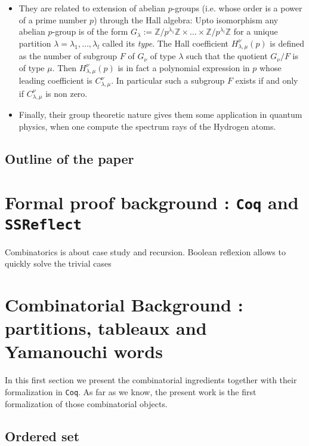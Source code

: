 \documentclass[12pt,a4paper]{article}
\newcommand{\Coq}{\texttt{Coq}\xspace}
\newcommand{\SSR}{\texttt{SSReflect}\xspace}
\newcommand{\Z}{{\mathbb Z}}
\begin{document}
\begin{itemize}
  \item They are related to extension of abelian $p$-groups (i.e. whose order
    is a power of a prime number $p$) through the Hall algebra: Upto
    isomorphism any abelian $p$-group is of the form
    $G_\lambda:=\Z/p^{\lambda_1}\Z\times\dots\times\Z/p^{\lambda_{l}}\Z$ for a
    unique partition $\lambda=\lambda_1,\dots,\lambda_{l}$ called its
    \emph{type}. The Hall coefficient $H_{\lambda,\mu}^{\nu}(p)$ is defined as
    the number of subgroup $F$ of $G_\nu$ of type $\lambda$ such that the
    quotient $G_\nu/F$ is of type $\mu$. Then $H_{\lambda,\mu}^{\nu}(p)$ is in
    fact a polynomial expression in $p$ whose leading coefficient is
    $C_{\lambda,\mu}^{\nu}$. In particular such a subgroup $F$ exists if and
    only if $C_{\lambda,\mu}^{\nu}$ is non zero.
\item Finally, their group theoretic nature gives them some application in
  quantum physics, when one compute the spectrum rays of the Hydrogen atoms.
\end{itemize}

\subsection{Outline of the paper}


\section{Formal proof background : \Coq and \SSR}

\todo[inline]{A small intro to \SSR}

Combinatorics is about case study and recursion.
Boolean reflexion allows to quickly solve the trivial cases

\section{Combinatorial Background : partitions, tableaux and Yamanouchi words}

In this first section we present the combinatorial ingredients together with
their formalization in \Coq. As far as we know, the present work is the first
formalization of those combinatorial objects.


\subsection{Ordered set}
\end{document}
